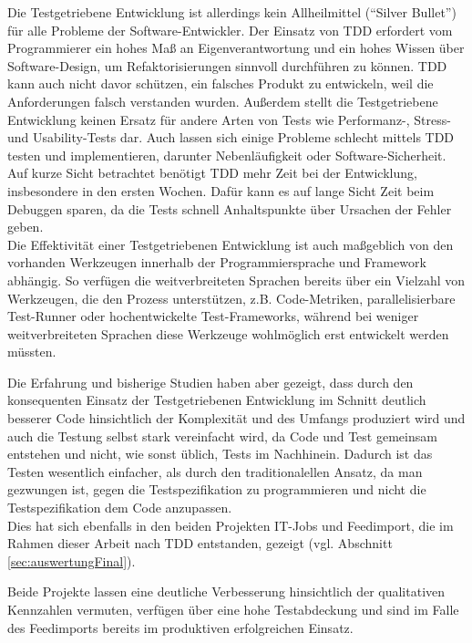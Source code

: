Die Testgetriebene Entwicklung ist allerdings kein Allheilmittel ("`Silver Bullet"') für alle Probleme der Software-Entwickler. Der Einsatz von TDD erfordert vom Programmierer ein hohes Maß an Eigenverantwortung und ein hohes Wissen über Software-Design, um Refaktorisierungen sinnvoll durchführen zu können. TDD kann auch nicht davor schützen, ein falsches Produkt zu entwickeln, weil die Anforderungen falsch verstanden wurden. Außerdem stellt die Testgetriebene Entwicklung keinen Ersatz für andere Arten von Tests wie Performanz-, Stress- und Usability-Tests dar. Auch lassen sich einige Probleme schlecht mittels TDD testen und implementieren, darunter Nebenläufigkeit oder Software-Sicherheit. Auf kurze Sicht betrachtet benötigt TDD mehr Zeit bei der Entwicklung, insbesondere in den ersten Wochen. Dafür kann es auf lange Sicht Zeit beim Debuggen sparen, da die Tests schnell Anhaltspunkte über Ursachen der Fehler geben.\\
Die Effektivität einer Testgetriebenen Entwicklung ist auch maßgeblich von den vorhanden Werkzeugen innerhalb der Programmiersprache und Framework abhängig. So verfügen die weitverbreiteten Sprachen bereits über ein Vielzahl von Werkzeugen, die den Prozess unterstützen, z.B. Code-Metriken, parallelisierbare Test-Runner oder hochentwickelte Test-Frameworks, während bei weniger weitverbreiteten Sprachen diese Werkzeuge wohlmöglich erst entwickelt werden müssten.

Die Erfahrung und bisherige Studien haben aber gezeigt, dass durch den konsequenten Einsatz der Testgetriebenen Entwicklung im Schnitt deutlich besserer Code hinsichtlich der Komplexität und des Umfangs produziert wird und auch die Testung selbst stark vereinfacht wird, da Code und Test gemeinsam entstehen und nicht, wie sonst üblich, Tests im Nachhinein. Dadurch ist das Testen wesentlich einfacher, als durch den traditionalellen Ansatz, da man gezwungen ist, gegen die Testspezifikation zu programmieren und nicht die Testspezifikation dem Code anzupassen.\\
Dies hat sich ebenfalls in den beiden Projekten IT-Jobs und Feedimport, die im Rahmen dieser Arbeit nach TDD entstanden, gezeigt (vgl. Abschnitt \ref{sec:auswertungFinal}).

Beide Projekte lassen eine deutliche Verbesserung hinsichtlich der qualitativen Kennzahlen vermuten, verfügen über eine hohe Testabdeckung und sind im Falle des Feedimports bereits im produktiven erfolgreichen Einsatz.

